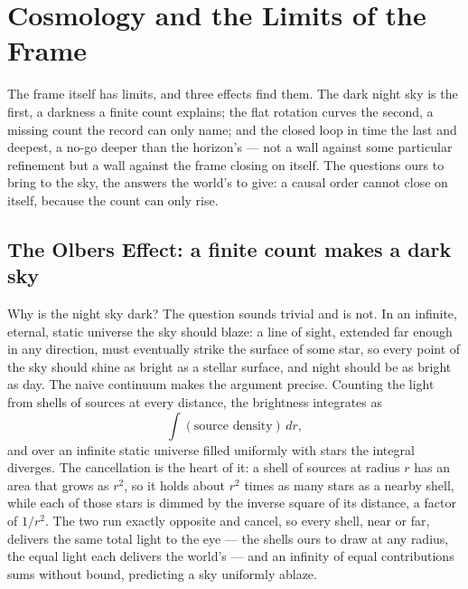 \chapter{Cosmology and the Limits of the Frame}
\label{chap:cosmology-limits-of-the-frame}

The frame itself has limits, and three effects find them. The dark night sky is the first, a darkness a finite
count explains; the flat rotation curves the second, a missing count the record can only name; and the closed
loop in time the last and deepest, a no-go deeper than the horizon's --- not a wall against some particular
refinement but a wall against the frame closing on itself. The questions ours to bring to the sky, the answers
the world's to give: a causal order cannot close on itself, because the count can only rise.

\section{The Olbers Effect: a finite count makes a dark sky}
\label{se:olbers}

Why is the night sky dark? The question sounds trivial and is not. In an infinite, eternal, static universe
the sky should blaze: a line of sight, extended far enough in any direction, must eventually strike the
surface of some star, so every point of the sky should shine as bright as a stellar surface, and night should
be as bright as day. The naive continuum makes the argument precise. Counting the light from
shells of sources at every distance, the brightness integrates as
\begin{equation}
  \int (\text{source density})\, dr,
\end{equation}
and over an infinite static universe filled uniformly with stars the integral diverges. The cancellation is the
heart of it: a shell of sources at radius $r$ has an area that grows as $r^2$, so it holds about $r^2$ times as
many stars as a nearby shell, while each of those stars is dimmed by the inverse square of its distance, a
factor of $1/r^2$. The two run exactly opposite and cancel, so every shell, near or far, delivers the same
total light to the eye --- the shells ours to draw at any radius, the equal light each delivers the world's ---
and an infinity of equal contributions sums without bound, predicting a sky uniformly ablaze.


